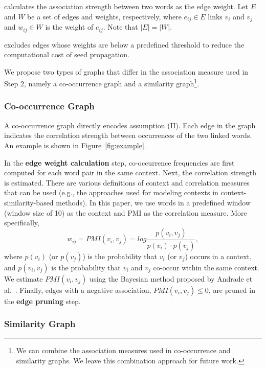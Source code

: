 \documentclass[english]{jnlp_1.4}
\begin{document}
 calculates the association strength between two words as the edge weight. 
Let $E$ and $W$ be a set of edges and weights, respectively, where $e_{ij} \in E$ links $v_{i}$ and $v_{j}$ and $w_{ij} \in W$ is the weight of $e_{ij}$. Note that $|E| = |W|$. 

 excludes edges whose weights are below a predefined threshold to reduce the computational cost of seed propagation. 

We propose two types of graphs that differ in the association measure used in Step 2, namely a co-occurrence graph and a similarity graph\footnote{We can combine the association measures used in co-occurrence and similarity graphs. We leave this combination approach for future work.}. 


\subsubsection{Co-occurrence Graph}

A co-occurrence graph directly encodes assumption (II). 
Each edge in the graph indicates the correlation strength between occurrences of the two linked words. 
An example is shown in Figure~\ref{fig:example}. 

In the {\bf edge weight calculation} step, co-occurrence frequencies are first computed for each word pair in the same context. Next, the correlation strength is estimated. 
There are various definitions of context and correlation measures that can be used (e.g., the approaches used for modeling contexts in context-similarity-based methods). 
In this paper, we use words in a predefined window (window size of 10) as the context and PMI as the correlation measure. More specifically, 
\begin{equation}
w_{ij}=\mathit{PMI}(v_{i},v_{j})=\mathit{log}\frac{p(v_{i},v_{j})}{p(v_{i})\cdot p(v_{j})},
\end{equation}
where $p(v_{i})$ (or $p(v_{j})$) is the probability that $v_{i}$ (or $v_{j}$) occurs in a context, and $p(v_{i},v_{j})$ is the probability that $v_{i}$ and $v_{j}$ co-occur within the same context. 
We estimate $\mathit{PMI}(v_{i},v_{j})$ using the Bayesian method proposed by Andrade et al.~\citeyear{andrade10}. 
Finally, edges with a negative association, $\mathit{PMI}(v_{i},v_{j}) \le 0$, are pruned in the {\bf edge pruning} step. 


\subsubsection{Similarity Graph}
\end{document}
